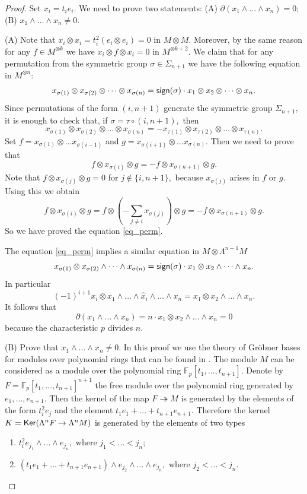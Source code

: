 \documentclass{amsart}
\numberwithin{equation}{section}
\theoremstyle{definition}
\def\epi{\twoheadrightarrow}
\begin{document}
\begin{proof} Set $x_i=t_ie_i.$ We need to prove two statements:
(A) $\partial(x_1\wedge \dots \wedge x_n)=0;$
(B) $x_1\wedge \dots \wedge x_n\ne 0.$

(A) Note that $x_i\otimes x_i=t_i^2(e_i\otimes e_i)=0$ in $M\otimes M.$ Moreover, by the same reason for any $f\in M^{\otimes k}$ we have $x_i\otimes f \otimes x_i=0$ in $M^{\otimes k+2}.$
We claim that for any permutation from the symmetric group $\sigma\in \Sigma_{n+1}$ we have the following equation in $M^{\otimes n}:$
\begin{equation}\label{eq_perm}
 x_{\sigma(1)} \otimes x_{\sigma(2)} \otimes  \dots \otimes x_{\sigma(n)}={\sf sign}(\sigma)\cdot  x_{1} \otimes x_{2} \otimes \dots \otimes x_{n}.   
\end{equation}
Since permutations of the form $(i,n+1)$ generate the symmetric group $\Sigma_{n+1},$ it is enough to check that, if $\sigma =\tau \circ (i,n+1),$ then 
$$x_{\sigma(1)} \otimes x_{\sigma(2)} \otimes  \dots \otimes x_{\sigma(n)}= -  x_{\tau(1)} \otimes x_{\tau(2)} \otimes \dots \otimes x_{\tau(n)}.$$ 
Set $f=x_{\sigma(1)}\otimes \dots x_{\sigma(i-1)}$ and $g=x_{\sigma(i+1)}\otimes \dots x_{\sigma(n)}.$ Then we need to prove that 
$$f\otimes x_{\sigma(i)} \otimes g=- f\otimes x_{\sigma(n+1)} \otimes g.$$
Note that $f\otimes x_{\sigma(j)}\otimes g=0$ for $j\notin \{i,n+1\},$ because $x_{\sigma(j)}$ arises in $f$ or $g.$ Using this we obtain 
$$f\otimes x_{\sigma(i)}\otimes g=f\otimes \left( -\sum_{j\ne i} x_{\sigma(j)}  \right)\otimes g= -f\otimes x_{\sigma(n+1)}\otimes g.$$
So we have proved the equation \eqref{eq_perm}.

The equation \eqref{eq_perm} implies a similar equation in $M\otimes \Lambda^{n-1}M$ 
$$x_{\sigma(1)} \otimes x_{\sigma(2)} \wedge  \dots \wedge x_{\sigma(n)}={\sf sign}(\sigma)\cdot  x_{1} \otimes x_{2} \wedge \dots \wedge x_{n}.$$
In particular 
$$(-1)^{i+1} x_i \otimes x_1\wedge \dots \wedge \hat x_i \wedge \dots \wedge x_n= x_1 \otimes x_2\wedge  \dots \wedge x_n.$$
It follows that 
$$\partial(x_1 \wedge \dots \wedge x_n)=n \cdot x_1 \otimes x_2 \wedge \dots \wedge x_n=0$$
because the characteristic $p$ divides $n.$ 

(B) Prove that $x_1 \wedge \dots \wedge x_n\ne 0.$ In this proof we use
the theory of Gr\"obner bases for modules over polynomial rings that can be found in \cite[Ch.3]{adams1994introduction}.  The module $M$ can be considered as a module over the polynomial ring $\mathbb F_p[t_1,\dots,t_{n+1}].$ Denote by $F=\mathbb F_p[t_1,\dots,t_{n+1}]^{n+1}$ the free module over the polynomial ring generated by $e_1,\dots,e_{n+1}.$ Then the kernel of the map $F\epi M$ is generated by the elements of the form $t_i^2 e_j $ and the element $t_1e_1+\dots+t_{n+1}e_{n+1}.$ Therefore the kernel  $K={\sf Ker}(\Lambda^nF\to \Lambda^n M)$ is generated by the elements of two types
\begin{enumerate}
\item[(1)] $t_{i}^2 e_{j_1}\wedge \dots \wedge e_{j_n},$ where $j_1<\dots <j_n;$
\item[(2)] $(t_1e_1+\dots+t_{n+1}e_{n+1}) \wedge e_{j_2} \wedge \dots \wedge e_{j_n},$ where $j_2<\dots<j_n.$
\end{enumerate}


\end{proof}
\end{document}

